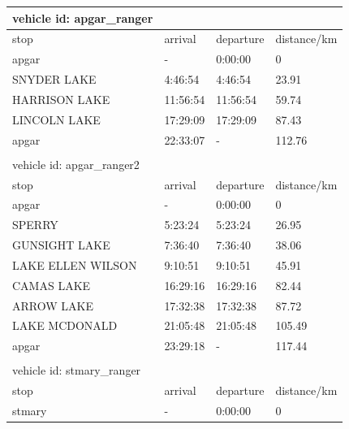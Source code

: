 \documentclass[12pt]{article}
\begin{document}
\begin{appendices}
\begin{table}[ht!]
\begin{tabular}{@{}llll@{}}
\toprule
vehicle id: apgar\_ranger        &          &           &             \\ \midrule
stop                             & arrival  & departure & distance/km \\
apgar                            & -        & 0:00:00   & 0           \\
SNYDER LAKE                      & 4:46:54  & 4:46:54   & 23.91       \\
HARRISON LAKE                    & 11:56:54 & 11:56:54  & 59.74       \\
LINCOLN LAKE                     & 17:29:09 & 17:29:09  & 87.43       \\
apgar                            & 22:33:07 & -         & 112.76      \\ \bottomrule
                                 &          &           &             \\ \toprule
vehicle id: apgar\_ranger2       &          &           &             \\ \midrule
stop                             & arrival  & departure & distance/km \\
apgar                            & -        & 0:00:00   & 0           \\
SPERRY                           & 5:23:24  & 5:23:24   & 26.95       \\
GUNSIGHT LAKE                    & 7:36:40  & 7:36:40   & 38.06       \\
LAKE ELLEN WILSON                & 9:10:51  & 9:10:51   & 45.91       \\
CAMAS LAKE                       & 16:29:16 & 16:29:16  & 82.44       \\
ARROW LAKE                       & 17:32:38 & 17:32:38  & 87.72       \\
LAKE MCDONALD                    & 21:05:48 & 21:05:48  & 105.49      \\
apgar                            & 23:29:18 & -         & 117.44      \\ \bottomrule
                                 &          &           &             \\ \toprule
vehicle id: stmary\_ranger       &          &           &             \\ \midrule
stop                             & arrival  & departure & distance/km \\
stmary                           & -        & 0:00:00   & 0           \\

\end{tabular}
\end{table}
\end{appendices}
\end{document}
